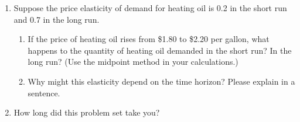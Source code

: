 \documentclass{article}
\begin{document}
\begin{enumerate}
\begin{enumerate}
	\end{enumerate}

\item Suppose the price elasticity of demand for heating oil is 0.2 in the short run and 0.7 in the long run.

	\begin{enumerate}
	
	\item If the price of heating oil rises from \$1.80 to \$2.20 per gallon, what happens to the quantity of heating oil demanded in the short run? In the long run? (Use the midpoint method in your calculations.)
	
	\item Why might this elasticity depend on the time horizon? Please explain in a sentence.
	
	\end{enumerate}
	
\item How long did this problem set take you?

\end{enumerate}
\end{document}
